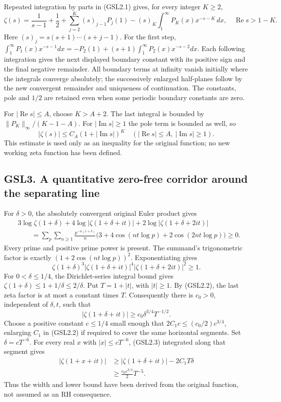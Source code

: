 Repeated integration by parts in (GSL2.1) gives, for every integer
\(K\ge2\), \[
\zeta(s)=\frac1{s-1}+\frac12
 +\sum_{j=2}^K(s)_{j-1}P_j(1)
 -(s)_K\int_1^\infty P_K(x)x^{-s-K}\,dx,
\quad\operatorname{Re}s>1-K.
\tag{GSL2.4}
\] Here \((s)_j=s(s+1)\cdots(s+j-1)\). For the first step,
\(\int_1^\infty P_1(x)x^{-s-1}dx=-P_2(1)+(s+1)\int_1^\infty P_2(x)x^{-s-2}dx\).
Each following integration gives the next displayed boundary constant
with its positive sign and the final negative remainder. All boundary
terms at infinity vanish initially where the integrals converge
absolutely; the successively enlarged half-planes follow by the new
convergent remainder and uniqueness of continuation. The constants, pole
and \(1/2\) are retained even when some periodic boundary constants are
zero.

For \(|\operatorname{Re}s|\le A\), choose \(K>A+2\). The last integral
is bounded by \(\|P_K\|_\infty/(K-1-A)\). For
\(|\operatorname{Im}s|\ge1\) the pole term is bounded as well, so \[
|\zeta(s)|\le C_A(1+|\operatorname{Im}s|)^{K}
\quad(|\operatorname{Re}s|\le A,\ |\operatorname{Im}s|\ge1).
\tag{GSL2.5}
\] This estimate is used only as an inequality for the original
function; no new working zeta function has been defined.

\subsection{GSL3. A quantitative zero-free corridor around the
separating
line}\label{gsl3.-a-quantitative-zero-free-corridor-around-the-separating-line}

For \(\delta>0\), the absolutely convergent original Euler product gives
\[
\begin{aligned}
&3\log\zeta(1+\delta)
 +4\log|\zeta(1+\delta+it)|
 +2\log|\zeta(1+\delta+2it)|\\
&\qquad=\sum_p\sum_{n\ge1}
 \frac{p^{-n(1+\delta)}}n
 \bigl(3+4\cos(nt\log p)+2\cos(2nt\log p)\bigr)\ge0.
\end{aligned}
\tag{GSL3.1}
\] Every prime and positive prime power is present. The summand's
trigonometric factor is exactly \((1+2\cos(nt\log p))^2\).
Exponentiating gives \[
\zeta(1+\delta)^3
 |\zeta(1+\delta+it)|^4
 |\zeta(1+\delta+2it)|^2\ge1.
\tag{GSL3.2}
\] For \(0<\delta\le1/4\), the Dirichlet-series integral bound gives
\(\zeta(1+\delta)\le1+1/\delta\le2/\delta\). Put \(T=1+|t|\), with
\(|t|\ge1\). By (GSL2.2), the last zeta factor is at most a constant
times \(T\). Consequently there is \(c_0>0\), independent of
\(\delta,t\), such that \[
|\zeta(1+\delta+it)|\ge c_0\delta^{3/4}T^{-1/2}.
\tag{GSL3.3}
\] Choose a positive constant \(c\le1/4\) small enough that
\(2C_1c\le(c_0/2)c^{3/4}\), enlarging \(C_1\) in (GSL2.2) if required to
cover the same horizontal segments. Set \(\delta=cT^{-6}\). For every
real \(x\) with \(|x|\le cT^{-6}\), (GSL2.3) integrated along that
segment gives \[
\begin{aligned}
|\zeta(1+x+it)|
&\ge|\zeta(1+\delta+it)|-2C_1T\delta\\
&\ge\frac{c_0c^{3/4}}2T^{-5}.
\end{aligned}
\tag{GSL3.4}
\] Thus the width and lower bound have been derived from the original
function, not assumed as an RH consequence.

